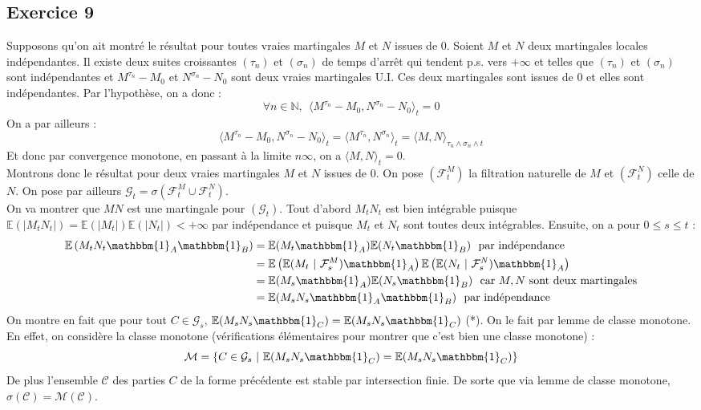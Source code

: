 \documentclass[a4paper,12pt]{article}
\newcommand{\E}{\mathbb{E}}
\newcommand{\ind}{\mathbbm{1}}
\newcommand{\f}{\mathcal{F}}
\newcommand{\n}{\mathbb{N}}
\begin{document}
\subsection{Exercice 9}
Supposons qu'on ait montré le résultat pour toutes vraies martingales $M$ et $N$ issues de $0$. Soient $M$ et $N$ deux martingales locales indépendantes. Il existe deux suites croissantes $(\tau_n)$ et $(\sigma_n)$ de temps d'arrêt qui tendent p.s. vers $+ \infty$ et telles que $(\tau_n)$ et $(\sigma_n)$ sont indépendantes et $M^{\tau_n}-M_0$ et $N^{\sigma_n}-N_0$ sont deux vraies martingales U.I. Ces deux martingales sont issues de $0$ et elles sont indépendantes. Par l'hypothèse, on a donc :
$$\forall n \in \n, \ \ \langle M^{\tau_n}-M_0, N^{\sigma_n} - N_0 \rangle_t = 0 $$
On a par ailleurs : 
$$\langle M^{\tau_n}-M_0, N^{\sigma_n}-N_0 \rangle_t = \langle M^{\tau_n}, N^{\sigma_n} \rangle_t = \langle M,N \rangle_{\tau_n \wedge \sigma_n \wedge t}$$
Et donc par convergence monotone, en passant à la limite $n \infty$, on a $\langle M,N \rangle_t = 0$. \\

Montrons donc le résultat pour deux vraies martingales $M$ et $N$ issues de $0$. On pose $(\f^M_t)$ la filtration naturelle de $M$ et $(\f^N_t)$ celle de $N$. On pose par ailleurs $\mathcal{G}_t = \sigma (\f^M_t \cup \f^N_t)$. \\

On va montrer que $MN$ est une martingale pour $(\mathcal{G}_t)$. Tout d'abord $M_t N_t$ est bien intégrable puisque $\E(|M_t N_t|) = \E (|M_t|) \E (|N_t|) < + \infty$ par indépendance et puisque $M_t$ et $N_t$ sont toutes deux intégrables. Ensuite, on a pour $0 \leq s \leq t$ :
\begin{align*}
\E \left( M_t N_t \ind_A \ind_B \right) & = \E (M_t \ind_A) \E (N_t \ind_B) \ \ \text{par indépendance} \\
& = \E \left( \E (M_t \ | \ \f_s^M)  \ind_A \right) \E \left( \E (N_t \ | \ \f_s^N)  \ind_A \right) \\
& = \E (M_s \ind_A) \E (N_s \ind_B) \ \ \text{car } M,N \text{ sont deux martingales} \\
& = \E (M_s N_s \ind_A \ind_B ) \ \ \text{par indépendance}
\end{align*}
On montre en fait que pour tout $C \in \mathcal{G}_s$, $\E (M_s N_s \ind_C) = \E (M_s N_s \ind_C)$ (*). On le fait par lemme de classe monotone. En effet, on considère la classe monotone  (vérifications élémentaires pour montrer que c'est bien une classe monotone) :
$$\mathcal{M} = \{ C \in \mathcal{G}_s \ | \ \E (M_s N_s \ind_C) = \E (M_s N_s \ind_C) \}$$
De plus l'ensemble $\mathcal{C}$ des parties $C$ de la forme précédente est stable par intersection finie. De sorte que via lemme de classe monotone, $\sigma (\mathcal{C}) = \mathcal{M} (\mathcal{C})$. \\
\end{document}
